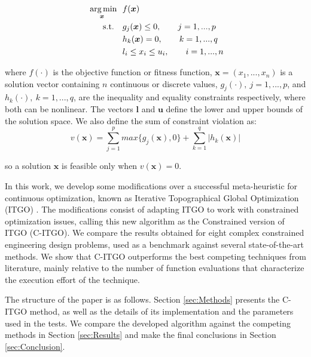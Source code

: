 \begin{equation}\label{eq:func}
    \begin{aligned}
    \underset{\bm{x}}{\text{\fnt{10} arg\,min}} \ \ & f(\bm{x}) \\
    \text{s.t.} \quad & g_j(\bm{x}) \leq 0, \qquad j = 1, ..., p  \\
                      & h_k(\bm{x}) = 0, \qquad k = 1, ..., q  \\ 
                      & l_i \leq x_i \leq u_i, \qquad i = 1, ..., n 
    \end{aligned}
\end{equation}

\noindent
where $f(\cdot)$ is the objective function or fitness function, $\bm{x} = (x_1, ..., x_n)$ is a solution vector containing $n$ continuous or discrete values, $g_j(\cdot), \ j = 1, ..., p$, and $h_k(\cdot), \ k = 1, ..., q$, are the inequality and equality constraints respectively, where both can be nonlinear. The vectors $\bm{l}$ and $\bm{u}$ define the lower and upper bounds of the solution space. We also define the sum of constraint violation as: \\[-3em]

\begin{equation}\label{eq:viol}
    v(\bm{x}) = \sum_{j=1}^p max\{g_j(\bm{x}), 0\} + \sum_{k=1}^q |h_k(\bm{x})|
\end{equation}

\noindent
so a solution $\bm{x}$ is feasible only when $v(\bm{x}) = 0$. 

In this work, we develop some modifications over a successful meta-heuristic for continuous optimization, known as Iterative Topographical Global Optimization (ITGO) \citep{ITGO0}. The modifications consist of adapting ITGO to work with constrained optimization issues, calling this new algorithm as the Constrained version of ITGO (C-ITGO). We compare the results obtained for eight complex constrained engineering design problems, used as a benchmark against several state-of-the-art methods. We show that C-ITGO outperforms the best competing techniques from literature, mainly relative to the number of function evaluations that characterize the execution effort of the technique.

The structure of the paper is as follows. Section \ref{sec:Methods} presents the C-ITGO method, as well as the details of its implementation and the parameters used in the tests. We compare the developed algorithm against the competing methods in Section \ref{sec:Results} and make the final conclusions in Section \ref{sec:Conclusion}.